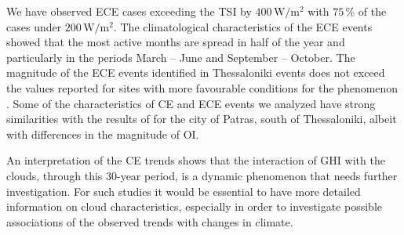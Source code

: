 \documentclass[preprint, 5p,
authoryear]{elsarticle} %
\begin{document}
We have observed ECE cases exceeding the TSI by
\(400\,\text{W}/\text{m}^{2}\) with \(75\,\%\) of the cases under
\(200\,\text{W}/\text{m}^{2}\). The climatological characteristics of
the ECE events showed that the most active months are spread in half of
the year and particularly in the periods March -- June and September --
October. The magnitude of the ECE events identified in Thessaloniki
events does not exceed the values reported for sites with more
favourable conditions for the phenomenon \citep[e.g.,][]{Cordero2023}.
Some of the characteristics of CE and ECE events we analyzed have strong
similarities with the results of \citet{Vamvakas2020} for the city of
Patras, south of Thessaloniki, albeit with differences in the magnitude
of OI.

An interpretation of the CE trends shows that the interaction of GHI
with the clouds, through this 30-year period, is a dynamic phenomenon
that needs further investigation. For such studies it would be essential
to have more detailed information on cloud characteristics, especially
in order to investigate possible associations of the observed trends
with changes in climate.


\end{document}
